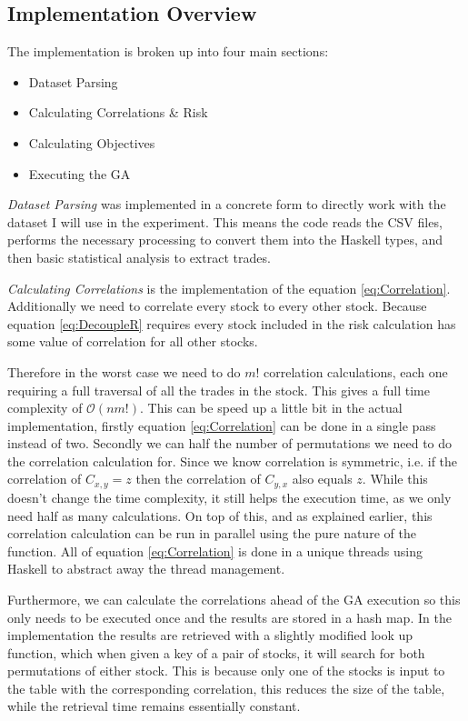 \documentclass[11pt]{article}
\newcommand{\bigO}{\mathcal{O}}
\begin{document}
\subsection{Implementation Overview}

    The implementation is broken up into four main sections:

    \begin{itemize}
        \item{Dataset Parsing}
        \item{Calculating Correlations \& Risk}
        \item{Calculating Objectives}
        \item{Executing the GA}
    \end{itemize}

    \textit{Dataset Parsing} was implemented in a concrete form to directly work with the
    dataset I will use in the experiment. This means the code reads the CSV files,
    performs the necessary processing to convert them into the Haskell types, and then
    basic statistical analysis to extract trades.

    \textit{Calculating Correlations} is the implementation of the equation \ref{eq:Correlation}.
    Additionally we need to correlate every stock to every other stock. Because equation
    \ref{eq:DecoupleR} requires every stock included in the risk calculation has some value of
    correlation for all other stocks.

    Therefore in the worst case we need to do \(m!\) correlation calculations, each one requiring a
    full traversal of all the trades in the stock. This gives a full time complexity of 
    \(\bigO (nm!) \). This can be speed up a little bit in the actual implementation, firstly
    equation \ref{eq:Correlation} can be done in a single pass instead of two. Secondly we can
    half the number of permutations we need to do the correlation calculation for. Since we know
    correlation is symmetric, i.e. if the correlation of \(C_{x,y} = z\) then the correlation
    of \(C_{y,x}\) also equals \(z\). While this doesn't change the time complexity, it still helps
    the execution time, as we only need half as many calculations. On top of this, and as explained
    earlier, this correlation calculation can be run in parallel using the pure nature of the function.
    All of equation \ref{eq:Correlation} is done in a unique threads using Haskell to abstract away
    the thread management.

    Furthermore, we can calculate the correlations ahead of the GA execution so this only needs to be
    executed once and the results are stored in a hash map. In the implementation the results are
    retrieved
    with a slightly modified look up function, which when given a key of a pair of stocks, it will
    search for both permutations of either stock. This is because only one of the stocks is input to the
    table with the corresponding correlation, this reduces the size of the table, while the retrieval time
    remains essentially constant.
\end{document}
